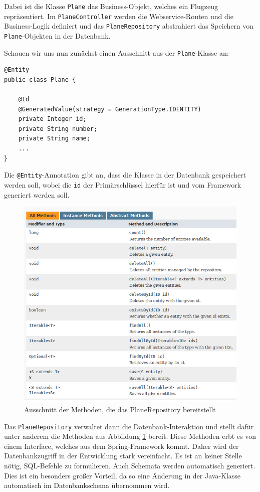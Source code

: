 \documentclass[a4paper, 11pt]{article}
\begin{document}
Dabei ist die Klasse \lstinline{Plane} das Business-Objekt, welches ein Flugzeug
repräsentiert. Im \lstinline{PlaneController} werden die Webservice-Routen und die
Business-Logik definiert und das \lstinline{PlaneRepository} abstrahiert das
Speichern von \lstinline{Plane}-Objekten in der Datenbank.

Schauen wir uns nun zunächst einen Ausschnitt aus der \lstinline{Plane}-Klasse an:

\begin{lstlisting}[caption=Entity-Klasse]
@Entity
public class Plane {

    @Id
    @GeneratedValue(strategy = GenerationType.IDENTITY)
    private Integer id;
    private String number;
    private String name;
    ...
}
\end{lstlisting}

Die \lstinline{@Entity}-Annotation gibt an, dass die Klasse in der Datenbank
gespeichert werden soll, wobei die \lstinline{id} der Primärschlüssel hierfür
ist und vom Framework generiert werden soll.

\begin{figure}[htpb]
    \centering
    \includegraphics[width=\textwidth]{images/crudrepository.png}
    \caption{Ausschnitt der Methoden, die das PlaneRepository bereitstellt}
    \label{fig:crudrepository}
\end{figure}

Das \texttt{PlaneRepository} verwaltet dann die Datenbank-Interaktion und
stellt dafür unter anderem die Methoden aus Abbildung \ref{fig:crudrepository}
bereit. Diese Methoden erbt es von einem Interface, welches aus dem
Spring-Framework kommt. Daher wird der Datenbankzugriff in der Entwicklung
stark vereinfacht. Es ist an keiner Stelle nötig, SQL-Befehle zu formulieren.
Auch Schemata werden automatisch generiert. Dies ist ein besonders großer
Vorteil, da so eine Änderung in der Java-Klasse automatisch im Datenbankschema
übernommen wird. 
\end{document}
